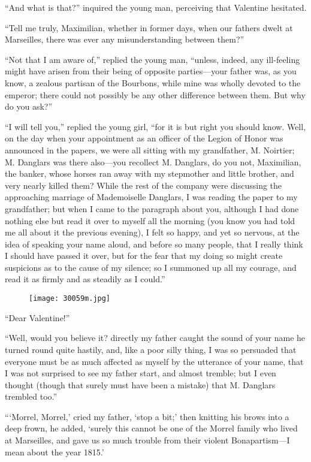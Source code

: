 “And what is that?” inquired the young man, perceiving that Valentine
hesitated.

“Tell me truly, Maximilian, whether in former days, when our fathers
dwelt at Marseilles, there was ever any misunderstanding between them?”

“Not that I am aware of,” replied the young man, “unless, indeed, any
ill-feeling might have arisen from their being of opposite parties—your
father was, as you know, a zealous partisan of the Bourbons, while mine
was wholly devoted to the emperor; there could not possibly be any
other difference between them. But why do you ask?”

“I will tell you,” replied the young girl, “for it is but right you
should know. Well, on the day when your appointment as an officer of
the Legion of Honor was announced in the papers, we were all sitting
with my grandfather, M. Noirtier; M. Danglars was there also—you
recollect M. Danglars, do you not, Maximilian, the banker, whose horses
ran away with my stepmother and little brother, and very nearly killed
them? While the rest of the company were discussing the approaching
marriage of Mademoiselle Danglars, I was reading the paper to my
grandfather; but when I came to the paragraph about you, although I had
done nothing else but read it over to myself all the morning (you know
you had told me all about it the previous evening), I felt so happy,
and yet so nervous, at the idea of speaking your name aloud, and before
so many people, that I really think I should have passed it over, but
for the fear that my doing so might create suspicions as to the cause
of my silence; so I summoned up all my courage, and read it as firmly
and as steadily as I could.”

\begin{figure}[ht]
\texttt{[image: 30059m.jpg]}
\end{figure}

“Dear Valentine!”

“Well, would you believe it? directly my father caught the sound of
your name he turned round quite hastily, and, like a poor silly thing,
I was so persuaded that everyone must be as much affected as myself by
the utterance of your name, that I was not surprised to see my father
start, and almost tremble; but I even thought (though that surely must
have been a mistake) that M. Danglars trembled too.”

“‘Morrel, Morrel,’ cried my father, ‘stop a bit;’ then knitting his
brows into a deep frown, he added, ‘surely this cannot be one of the
Morrel family who lived at Marseilles, and gave us so much trouble from
their violent Bonapartism—I mean about the year 1815.’

